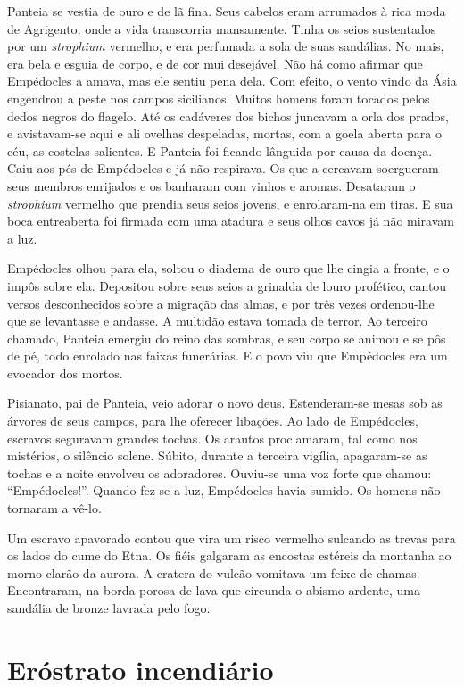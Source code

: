 Panteia se vestia de ouro e de lã fina. Seus cabelos eram arrumados à rica
moda de Agrigento, onde a vida transcorria mansamente. Tinha os seios
sustentados por um \textit{strophium} vermelho, e era perfumada a sola de
suas sandálias. No mais, era bela e esguia de corpo, e de cor mui
desejável. Não há como afirmar que Empédocles a amava, mas ele sentiu pena
dela. Com efeito, o vento vindo da Ásia engendrou a peste nos campos
sicilianos. Muitos homens foram tocados pelos dedos negros do flagelo. Até
os cadáveres dos bichos juncavam a orla dos prados, e avistavam-se aqui e
ali ovelhas despeladas, mortas, com a goela aberta para o céu, as costelas
salientes. E Panteia foi ficando lânguida por causa da doença. Caiu aos
pés de Empédocles e já não respirava. Os que a cercavam soergueram seus
membros enrijados e os banharam com vinhos e aromas. Desataram o
\textit{strophium} vermelho que prendia seus seios jovens, e enrolaram-na
em tiras. E sua boca entreaberta foi firmada com uma atadura e seus olhos
cavos já não miravam a luz.

Empédocles olhou para ela, soltou o diadema de ouro que lhe cingia a
fronte, e o impôs sobre ela. Depositou sobre seus seios a grinalda de
louro profético, cantou versos desconhecidos sobre a migração das almas, e
por três vezes ordenou-lhe que se levantasse e andasse. A multidão estava
tomada de terror. Ao terceiro chamado, Panteia emergiu do reino das
sombras, e seu corpo se animou e se pôs de pé, todo enrolado nas faixas
funerárias. E o povo viu que Empédocles era um evocador dos mortos.

Pisianato, pai de Panteia, veio adorar o novo deus. Estenderam-se mesas sob
as árvores de seus campos, para lhe oferecer libações. Ao lado de
Empédocles, escravos seguravam grandes tochas. Os arautos proclamaram, tal
como nos mistérios, o silêncio solene. Súbito, durante a terceira vigília,
apagaram-se as tochas e a noite envolveu os adoradores. Ouviu-se uma voz
forte que chamou: “Empédocles!”. Quando fez-se a luz, Empédocles havia
sumido. Os homens não tornaram a vê-lo.

Um escravo apavorado contou que vira um risco vermelho sulcando as trevas
para os lados do cume do Etna. Os fiéis galgaram as encostas estéreis da
montanha ao morno clarão da aurora. A cratera do vulcão vomitava um feixe
de chamas. Encontraram, na borda porosa de lava que circunda o abismo
ardente, uma sandália de bronze lavrada pelo fogo.

\chapter{Eróstrato incendiário}


